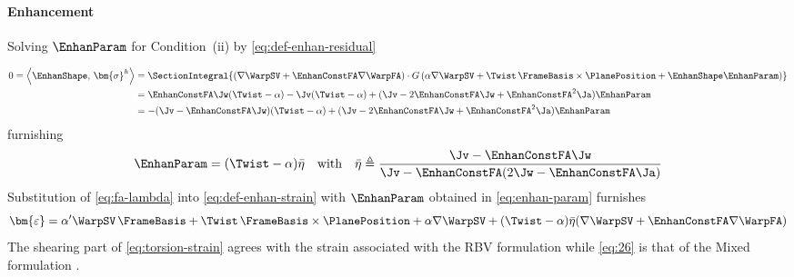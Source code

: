\paragraph{Enhancement}
Solving \(\EnhanParam\) for Condition~(ii) by \eqref{eq:def-enhan-residual}

\begin{equation*}
\begin{aligned}
0 = \left<\EnhanShape,\, \bm{\sigma}^h \right> 
&= \SectionIntegral{
    (\nabla \WarpSV + \EnhanConstFA \nabla \WarpFA)
    \cdot G \left(\alpha \nabla \WarpSV + \Twist\, \FrameBasis \times \PlanePosition + \EnhanShape \EnhanParam \right)
    } \\
&= \EnhanConstFA \Jw (\Twist - \alpha) - \Jv( \Twist - \alpha) + (\Jv - 2 \EnhanConstFA \Jw + \EnhanConstFA^2 \Ja) \EnhanParam \\
&= - (\Jv - \EnhanConstFA \Jw) (\Twist - \alpha) + (\Jv - 2 \EnhanConstFA \Jw + \EnhanConstFA^2 \Ja) \EnhanParam
\end{aligned}
\end{equation*}
%
furnishing
\begin{equation}
\begin{aligned}
\EnhanParam 
&= (\Twist - \alpha) \bar{\eta} \\
\end{aligned}
\quad\text{with}\quad 
\bar{\eta} \triangleq \frac{\Jv - \EnhanConstFA \Jw}{\Jv - \EnhanConstFA (2 \Jw - \EnhanConstFA \Ja)}
\label{eq:enhan-param}
\end{equation}
%
Substitution of \eqref{eq:fa-lambda} into \eqref{eq:def-enhan-strain} with \(\EnhanParam\) obtained in \eqref{eq:enhan-param} furnishes
%
\begin{equation}
\begin{aligned}
\bm{\varepsilon} 
&= \alpha' \WarpSV\, \FrameBasis + \Twist\, \FrameBasis \times \PlanePosition + \alpha \nabla \WarpSV + (\Twist - \alpha) \bar{\eta} (\nabla \WarpSV + \EnhanConstFA \nabla \WarpFA) \\
\end{aligned}
\label{eq:26}
\end{equation}
The shearing part of 
\eqref{eq:torsion-strain} agrees with the strain associated with the RBV formulation \citep[eq. 108]{armero2021modeling} while \eqref{eq:26} is that of the Mixed formulation \citep[eq. 161]{armero2021modeling}.
%

